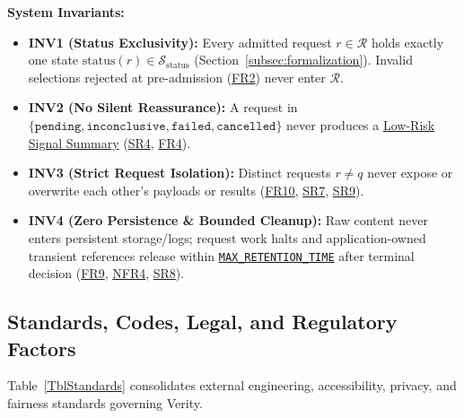 \documentclass[11pt]{article}
\newcommand{\MaxRetentionTime}{\hyperref[const:MAX_RETENTION_TIME]{\texttt{MAX\_\allowbreak{}RETENTION\_\allowbreak{}TIME}}}
\newcommand{\TermLowRisk}{\hyperlink{gls-lowrisk}{Low-Risk Signal Summary}}
\begin{document}
\noindent\textbf{System Invariants:}
\begin{itemize}[leftmargin=*, itemsep=2pt]
    \item {}\label{INV1}\textbf{INV1 (Status Exclusivity):} Every admitted request $r \in \mathcal{R}$ holds exactly one state $\text{status}(r) \in \mathcal{S}_{\text{status}}$ (Section~\ref{subsec:formalization}). Invalid selections rejected at pre-admission (\hyperref[FR2]{FR2}) never enter $\mathcal{R}$.
    \item {}\label{INV2}\textbf{INV2 (No Silent Reassurance):} A request in $\{\texttt{pending},\allowbreak\texttt{inconclusive},\allowbreak\texttt{failed},\allowbreak\texttt{cancelled}\}$ never produces a \TermLowRisk{} (\hyperref[SR4]{SR4}, \hyperref[FR4]{FR4}).
    \item {}\label{INV3}\textbf{INV3 (Strict Request Isolation):} Distinct requests $r \neq q$ never expose or overwrite each other's payloads or results (\hyperref[FR10]{FR10}, \hyperref[SR7]{SR7}, \hyperref[SR9]{SR9}).
    \item {}\label{INV4}\textbf{INV4 (Zero Persistence \& Bounded Cleanup):} Raw content never enters persistent storage/logs; request work halts and application-owned transient references release within \MaxRetentionTime{} after terminal decision (\hyperref[FR9]{FR9}, \hyperref[NFR4]{NFR4}, \hyperref[SR8]{SR8}).
\end{itemize}

\subsection{Standards, Codes, Legal, and Regulatory Factors}\label{subsec:standards-legal}

Table~\ref{TblStandards} consolidates external engineering, accessibility, privacy, and fairness standards governing Verity.
\end{document}
